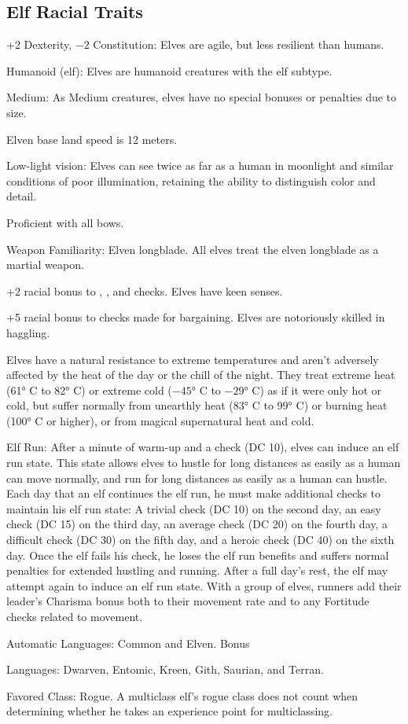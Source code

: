 \subsection{Elf Racial Traits}
\begin{itemize*}
    \item +2 Dexterity, $-2$ Constitution: Elves are agile, but less resilient than humans.
    \item Humanoid (elf): Elves are humanoid creatures with the elf subtype.
    \item Medium: As Medium creatures, elves have no special bonuses or penalties due to size.
    \item Elven base land speed is 12 meters.
    \item Low-light vision: Elves can see twice as far as a human in moonlight and similar conditions of poor illumination, retaining the ability to distinguish color and detail.
    \item Proficient with all bows.
    \item Weapon Familiarity: Elven longblade. All elves treat the elven longblade as a martial weapon.
    \item +2 racial bonus to , ,  and  checks. Elves have keen senses.
    \item +5 racial bonus to  checks made for bargaining. Elves are notoriously skilled in haggling.
    \item Elves have a natural resistance to extreme temperatures and aren't adversely affected by the heat of the day or the chill of the night. They treat extreme heat (61° C to 82° C) or extreme cold ($-45$° C to $-29$° C) as if it were only hot or cold, but suffer normally from unearthly heat (83° C to 99° C) or burning heat (100° C or higher), or from magical supernatural heat and cold.
    \item Elf Run: After a minute of warm-up and a  check (DC 10), elves can induce an elf run state. This state allows elves to hustle for long distances as easily as a human can move normally, and run for long distances as easily as a human can hustle. Each day that an elf continues the elf run, he must make additional  checks to maintain his elf run state: A trivial check (DC 10) on the second day, an easy check (DC 15) on the third day, an average check (DC 20) on the fourth day, a difficult check (DC 30) on the fifth day, and a heroic check (DC 40) on the sixth day. Once the elf fails his  check, he loses the elf run benefits and suffers normal penalties for extended hustling and running. After a full day's rest, the elf may attempt again to induce an elf run state. With a group of elves, runners add their leader's Charisma bonus both to their movement rate and to any Fortitude checks related to movement.
    \item Automatic Languages: Common and Elven. Bonus
    \item Languages: Dwarven, Entomic, Kreen, Gith, Saurian, and Terran.
    \item Favored Class: Rogue. A multiclass elf's rogue class does not count when determining whether he takes an experience point for multiclassing.
\end{itemize*}